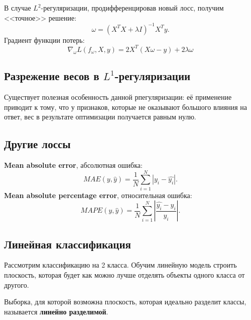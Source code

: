\documentclass[a4paper, 10pt, openany]{book} %
\begin{document}
	В случае $L^2$-регуляризации, продифференцировав новый лосс, получим <<точное>> решение:
	\begin{equation*}
		\omega = (X^TX + \lambda I)^{-1}X^Ty.
	\end{equation*}
	Градиент функции потерь:
	\begin{equation*}
		\nabla_\omega L(f_\omega, X, y) = 2X^T(X\omega - y) + 2\lambda\omega
	\end{equation*}
	
	\subsection{Разрежение весов в $L^1$-регуляризации}
	
	Существует полезная особенность данной рпегуляризации: её применение приводит к тому, что у признаков, которые не оказывают большого влияния на ответ, вес в результате оптимизации получается равным нулю.
	
	\subsection{Другие лоссы}
	
	\textbf{Mean absolute error}, абсолютная ошибка:
	\begin{equation*}
		MAE(y,\widehat{y}) = \frac{1}{N} \sum_{i=1}^{N}|y_i - \widehat{y_i}|.
	\end{equation*} 
	\textbf{Mean absolute percentage error}, относительная ошибка:
	\begin{equation*}
		MAPE(y,\widehat{y}) = \frac{1}{N} \sum_{i=1}^{N}\left|\frac{\widehat{y_i} - y_i}{y_i}\right|.
	\end{equation*}
	
	\subsection{Линейная классификация}
	
	Рассмотрим классификацию на 2 класса. Обучим линейную модель строить плоскость, которая будет как можно лучше отделять объекты одного класса от другого.
	
	Выборка, для которой возможна плоскость, которая идеально разделит классы, называется \textbf{линейно разделимой}.
	
\end{document}
